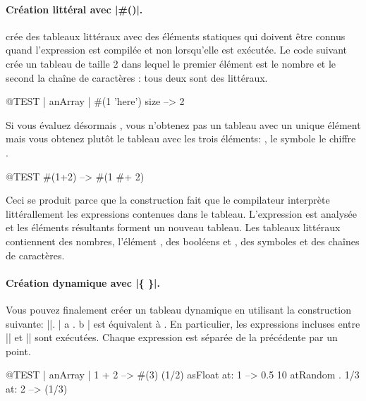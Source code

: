 \documentclass[a4paper,10pt,twoside]{book}
\begin{document}
\paragraph{Création littéral avec \ct|\#()|.}
\ct{#()} crée des tableaux littéraux avec des éléments
statiques qui doivent être connus
quand l'expression est compilée et non lorsqu'elle est exécutée.
Le code suivant crée un tableau de taille 2
dans lequel le premier élément est le nombre 
et le second la chaîne de caractères : tous deux sont des littéraux.


\begin{code}{@TEST | anArray |}
#(1 'here') size --> 2
\end{code}

Si vous évaluez désormais , vous n'obtenez pas un tableau
avec un unique élément  mais vous obtenez plutôt le tableau
 \ie avec les trois éléments: , le symbole
\ct{#+} le chiffre .

\begin{code}{@TEST}
#(1+2) -->  #(1 #+ 2)
\end{code}

\noindent
Ceci se produit parce que la construction \ct{#()} fait que
le compilateur interprète littérallement les expressions contenues dans
le tableau. L'expression est analysée et les éléments résultants
forment un nouveau tableau. Les tableaux littéraux contiennent des
nombres, l'élément , des booléens  et ,
des symboles et des chaînes de caractères.

\paragraph{Création dynamique avec \ct|\{ \}|.}
Vous pouvez finalement créer un tableau dynamique en utilisant
la construction suivante: \ct|{}|. \ct|{ a . b }| est équivalent
à . En particulier, les expressions incluses
entre \ct|{| et \ct|}| sont exécutées. Chaque expression est séparée de la précédente par un point.

\begin{code}{@TEST | anArray |}
{ 1 + 2 } --> #(3)
{(1/2) asFloat} at: 1 --> 0.5
{10 atRandom . 1/3} at: 2 --> (1/3)
\end{code}
\end{document}

